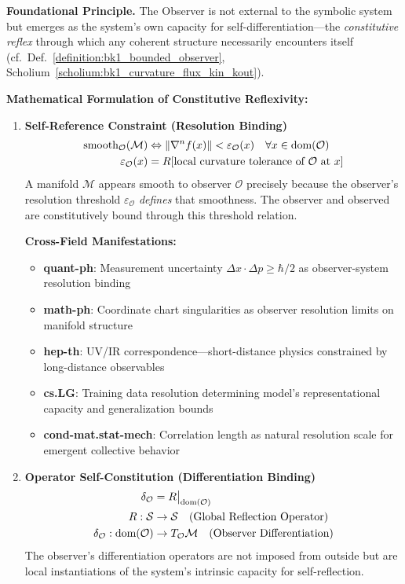 \begin{scholium}
\label{scholium:bk1_constitutive_reflex}
\textbf{Foundational Principle.} The Observer is not external to the symbolic system but emerges as the system's own capacity for self-differentiation—the \textit{constitutive reflex} through which any coherent structure necessarily encounters itself (cf.~Def.~\ref{definition:bk1_bounded_observer}, Scholium~\ref{scholium:bk1_curvature_flux_kin_kout}).

\textbf{Mathematical Formulation of Constitutive Reflexivity:}

\begin{enumerate}
\item \textbf{Self-Reference Constraint (Resolution Binding)}
\begin{align}
\text{smooth}_{\mathcal{O}}(\mathcal{M}) &\Leftrightarrow \|\nabla^n f(x)\| < \varepsilon_{\mathcal{O}}(x) \quad \forall x \in \text{dom}(\mathcal{O}) \\
\varepsilon_{\mathcal{O}}(x) &= R[\text{local curvature tolerance of } \mathcal{O} \text{ at } x]
\end{align}
A manifold $\mathcal{M}$ appears smooth to observer $\mathcal{O}$ precisely because the observer's resolution threshold $\varepsilon_{\mathcal{O}}$ \textit{defines} that smoothness. The observer and observed are constitutively bound through this threshold relation.

\textbf{Cross-Field Manifestations:}
\begin{itemize}
\item \textbf{quant-ph}: Measurement uncertainty $\Delta x \cdot \Delta p \geq \hbar/2$ as observer-system resolution binding
\item \textbf{math-ph}: Coordinate chart singularities as observer resolution limits on manifold structure
\item \textbf{hep-th}: UV/IR correspondence—short-distance physics constrained by long-distance observables
\item \textbf{cs.LG}: Training data resolution determining model's representational capacity and generalization bounds
\item \textbf{cond-mat.stat-mech}: Correlation length as natural resolution scale for emergent collective behavior
\end{itemize}

\item \textbf{Operator Self-Constitution (Differentiation Binding)}
\begin{align}
\delta_{\mathcal{O}} &= R\big|_{\text{dom}(\mathcal{O})} \\
R: \mathcal{S} &\rightarrow \mathcal{S} \quad \text{(Global Reflection Operator)} \\
\delta_{\mathcal{O}}: \text{dom}(\mathcal{O}) &\rightarrow T_{\mathcal{O}}\mathcal{M} \quad \text{(Observer Differentiation)}
\end{align}
The observer's differentiation operators are not imposed from outside but are local instantiations of the system's intrinsic capacity for self-reflection.


\end{enumerate}
\end{scholium}
